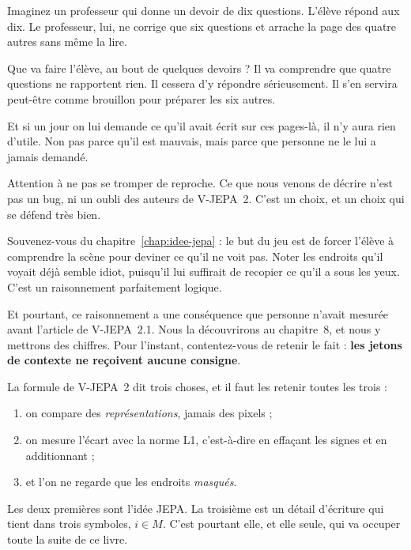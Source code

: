 \begin{intuition}
Imaginez un professeur qui donne un devoir de dix questions. L'élève répond
aux dix. Le professeur, lui, ne corrige que six questions et arrache la page
des quatre autres sans même la lire.

Que va faire l'élève, au bout de quelques devoirs ? Il va comprendre que
quatre questions ne rapportent rien. Il cessera d'y répondre sérieusement.
Il s'en servira peut-être comme brouillon pour préparer les six autres.

Et si un jour on lui demande ce qu'il avait écrit sur ces pages-là, il n'y
aura rien d'utile. Non pas parce qu'il est mauvais, mais parce que personne
ne le lui a jamais demandé.
\end{intuition}

\begin{piege}
Attention à ne pas se tromper de reproche. Ce que nous venons de décrire
n'est pas un bug, ni un oubli des auteurs de V-JEPA~2. C'est un choix, et un
choix qui se défend très bien.

Souvenez-vous du chapitre~\ref{chap:idee-jepa} : le but du jeu est de forcer
l'élève à comprendre la scène pour deviner ce qu'il ne voit pas. Noter les
endroits qu'il voyait déjà semble idiot, puisqu'il lui suffirait de recopier
ce qu'il a sous les yeux. C'est un raisonnement parfaitement logique.

Et pourtant, ce raisonnement a une conséquence que personne n'avait mesurée
avant l'article de V-JEPA~2.1. Nous la découvrirons au chapitre~8, et nous y
mettrons des chiffres. Pour l'instant, contentez-vous de retenir le fait :
\textbf{les jetons de contexte ne reçoivent aucune consigne}.
\end{piege}

\begin{aretenir}
La formule de V-JEPA~2 dit trois choses, et il faut les retenir toutes les
trois :

\begin{enumerate}
  \item on compare des \emph{représentations}, jamais des pixels ;
  \item on mesure l'écart avec la norme L1, c'est-à-dire en effaçant les
        signes et en additionnant ;
  \item et l'on ne regarde que les endroits \emph{masqués}.
\end{enumerate}

Les deux premières sont l'idée JEPA. La troisième est un détail d'écriture
qui tient dans trois symboles, $i \in M$. C'est pourtant elle, et elle
seule, qui va occuper toute la suite de ce livre.
\end{aretenir}

